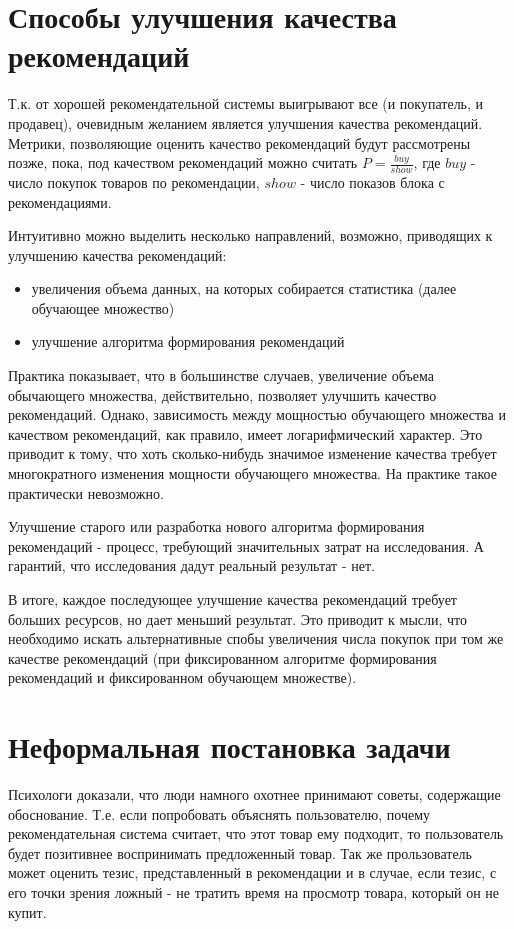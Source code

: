 \documentclass[12pt,a4paper]{report}
\begin{document}
\section{Способы улучшения качества рекомендаций}
Т.к. от хорошей рекомендательной системы выигрывают все (и покупатель, и продавец), очевидным желанием является улучшения качества рекомендаций.
Метрики, позволяющие оценить качество рекомендаций будут рассмотрены позже, пока, под качеством рекомендаций можно считать $P=\frac{buy}{show}$, где $buy$ - число покупок товаров по рекомендации, $show$ - число показов блока с рекомендациями.

Интуитивно можно выделить несколько направлений, возможно, приводящих к улучшению качества рекомендаций:
\begin{itemize}
\item увеличения объема данных, на которых собирается статистика (далее обучающее множество)
\item улучшение алгоритма формирования рекомендаций
\end{itemize}
Практика показывает, что в большинстве случаев, увеличение объема обычающего множества, действительно, позволяет улучшить качество рекомендаций. Однако, зависимость между мощностью обучающего множества и качеством рекомендаций, как правило, имеет логарифмический характер. Это приводит к тому, что хоть сколько-нибудь значимое изменение качества требует многократного изменения мощности обучающего множества. На практике такое практически невозможно.


Улучшение старого или разработка нового алгоритма формирования рекомендаций - процесс, требующий значительных затрат на исследования. А гарантий, что исследования дадут реальный результат - нет.

В итоге, каждое последующее улучшение качества рекомендаций требует больших ресурсов, но дает меньший результат.
Это приводит к мысли, что  необходимо искать альтернативные спобы увеличения числа покупок при том же качестве рекомендаций (при фиксированном алгоритме формирования рекомендаций и фиксированном обучающем множестве).

\section{Неформальная постановка задачи}
Психологи доказали, что люди намного охотнее принимают советы, содержащие обоснование. Т.е. если попробовать объяснять пользователю, почему рекомендательная система считает, что этот товар ему подходит, то пользователь будет позитивнее воспринимать предложенный товар. Так же прользователь может оценить тезис, представленный в рекомендации и в случае, если тезис, с его точки зрения ложный - не тратить время на просмотр товара, который он не купит.
\end{document}
